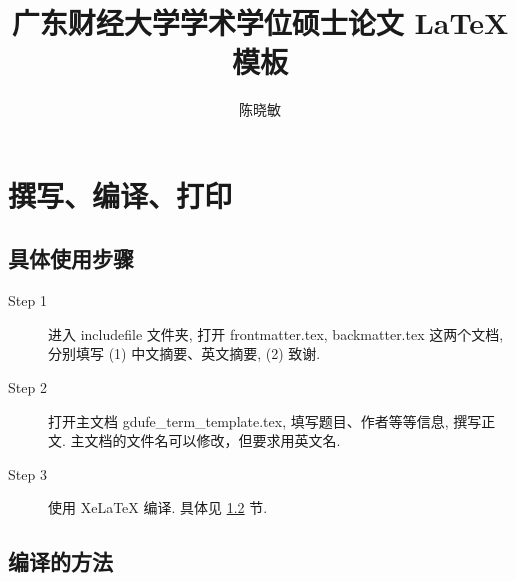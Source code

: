 \documentclass[forprint]{gdufe_master_thesis}
\begin{document}
\title{广东财经大学学术学位硕士论文 \LaTeX 模板}
\author{陈晓敏}

\frontmatter
\tableofcontents
\mainmatter
\pagestyle{master-mainmatter}
\chapter{撰写、编译、打印}

\section{具体使用步骤}

\begin{description}

    \item[Step 1]  进入 includefile 文件夹,  打开 frontmatter.tex, backmatter.tex 这两个文档,
          分别填写 (1) 中文摘要、英文摘要, (2) 致谢.

    \item[Step 2]  打开主文档 gdufe\_term\_template.tex, 填写题目、作者等等信息, 撰写正文. 主文档的文件名可以修改，但要求用英文名.

    \item[Step 3]  使用 XeLaTeX 编译. 具体见 \ref{sec-compile} 节.

\end{description}

\section{编译的方法}\label{sec-compile}
\end{document}

